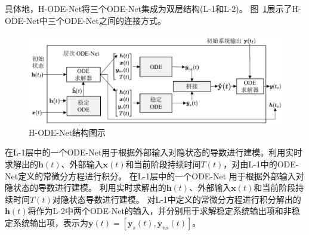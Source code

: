 具体地，H-ODE-Net将三个ODE-Net集成为双层结构(L-1和L-2)。
图~\ref{fig:H_ode}展示了H-ODE-Net中三个ODE-Net之间的连接方式。
\begin{figure}
    \centering
    \includegraphics[width=\linewidth]{figures/chapter4/Hode.pdf}
    \caption{H-ODE-Net结构图示}
    \label{fig:H_ode}
\end{figure}
在L-1层中的一个ODE-Net用于根据外部输入对隐状态的导数进行建模。利用实时求解出的$\boldsymbol h(t)$、外部输入$\boldsymbol x(t)$和当前阶段持续时间$T(t)$，对由L-1中的ODE-Net定义的常微分方程进行积分。
在L-1层中的一个ODE-Net
用于根据外部输入对隐状态的导数进行建模。
利用实时求解出的$\boldsymbol h(t)$、外部输入$\boldsymbol x(t)$和当前阶段持续时间$T(t)$对隐状态导数进行建模。
对L-1中定义的常微分方程进行积分解出的$\boldsymbol h(t)$将作为L-2中两个ODE-Net的输入，并分别用于求解稳定系统输出项和非稳定系统输出项，表示为$\boldsymbol y(t)=[\boldsymbol y_s(t), \boldsymbol y_{ns}(t)]$。


